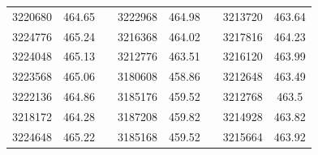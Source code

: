 \documentclass[12pt]{mwart}
\begin{document}
\begin{table}[H]
\begin{tabular}{cclcclcc}
		3220680                                                  & 464.65                                                        &  & 3222968                                                  & 464.98                                                        &  & 3213720                                                  & 463.64                                                        \\
		3224776                                                  & 465.24                                                        &  & 3216368                                                  & 464.02                                                        &  & 3217816                                                  & 464.23                                                        \\
		3224048                                                  & 465.13                                                        &  & 3212776                                                  & 463.51                                                        &  & 3216120                                                  & 463.99                                                        \\
		3223568                                                  & 465.06                                                        &  & 3180608                                                  & 458.86                                                        &  & 3212648                                                  & 463.49                                                        \\
		3222136                                                  & 464.86                                                        &  & 3185176                                                  & 459.52                                                        &  & 3212768                                                  & 463.5                                                         \\
		3218172                                                  & 464.28                                                        &  & 3187208                                                  & 459.82                                                        &  & 3214928                                                  & 463.82                                                        \\
		3224648                                                  & 465.22                                                        &  & 3185168                                                  & 459.52                                                        &  & 3215664                                                  & 463.92                                                        \\

\end{tabular}
\end{table}
\end{document}
